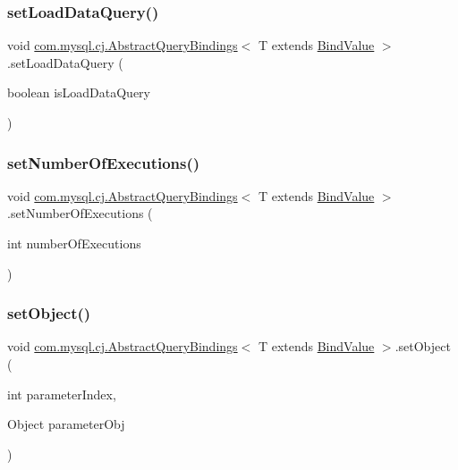 \subsubsection{\texorpdfstring{set\+Load\+Data\+Query()}{setLoadDataQuery()}}
{\footnotesize\ttfamily void \mbox{\hyperlink{classcom_1_1mysql_1_1cj_1_1_abstract_query_bindings}{com.\+mysql.\+cj.\+Abstract\+Query\+Bindings}}$<$ T extends \mbox{\hyperlink{interfacecom_1_1mysql_1_1cj_1_1_bind_value}{Bind\+Value}} $>$.set\+Load\+Data\+Query (\begin{DoxyParamCaption}\item[{boolean}]{is\+Load\+Data\+Query }\end{DoxyParamCaption})}

\mbox{\label{classcom_1_1mysql_1_1cj_1_1_abstract_query_bindings_a2f4900412aa5d9ea460e8d246d45a85a}} 
\subsubsection{\texorpdfstring{set\+Number\+Of\+Executions()}{setNumberOfExecutions()}}
{\footnotesize\ttfamily void \mbox{\hyperlink{classcom_1_1mysql_1_1cj_1_1_abstract_query_bindings}{com.\+mysql.\+cj.\+Abstract\+Query\+Bindings}}$<$ T extends \mbox{\hyperlink{interfacecom_1_1mysql_1_1cj_1_1_bind_value}{Bind\+Value}} $>$.set\+Number\+Of\+Executions (\begin{DoxyParamCaption}\item[{int}]{number\+Of\+Executions }\end{DoxyParamCaption})}

\mbox{\label{classcom_1_1mysql_1_1cj_1_1_abstract_query_bindings_a1dee6ee1875e05ebced2c60984c0c8e7}} 
\subsubsection{\texorpdfstring{set\+Object()}{setObject()}\hspace{0.1cm}{\footnotesize\ttfamily [1/3]}}
{\footnotesize\ttfamily void \mbox{\hyperlink{classcom_1_1mysql_1_1cj_1_1_abstract_query_bindings}{com.\+mysql.\+cj.\+Abstract\+Query\+Bindings}}$<$ T extends \mbox{\hyperlink{interfacecom_1_1mysql_1_1cj_1_1_bind_value}{Bind\+Value}} $>$.set\+Object (\begin{DoxyParamCaption}\item[{int}]{parameter\+Index,  }\item[{Object}]{parameter\+Obj }\end{DoxyParamCaption})}

